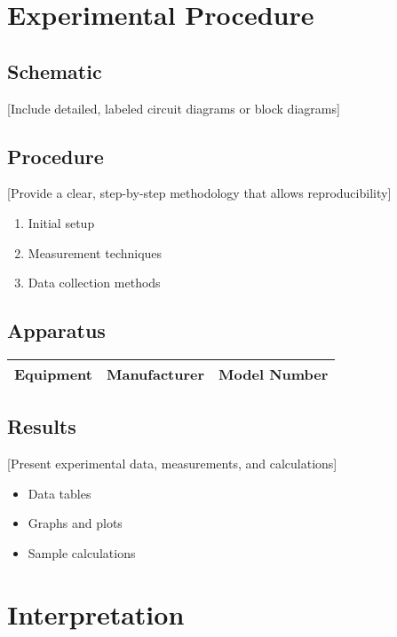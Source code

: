 \documentclass[a4paper]{article}
\begin{document}
\section{Experimental Procedure}
\subsection{Schematic}
[Include detailed, labeled circuit diagrams or block diagrams]

\subsection{Procedure}
[Provide a clear, step-by-step methodology that allows reproducibility]
\begin{enumerate}
    \item Initial setup
    \item Measurement techniques
    \item Data collection methods
\end{enumerate}

\subsection{Apparatus}
\begin{tabular}{|l|l|l|}
    \hline
    \textbf{Equipment} & \textbf{Manufacturer} & \textbf{Model Number} \\
    \hline
    \hline
\end{tabular}

\subsection{Results}
[Present experimental data, measurements, and calculations]
\begin{itemize}
    \item Data tables
    \item Graphs and plots
    \item Sample calculations
\end{itemize}

\section{Interpretation}
\end{document}
